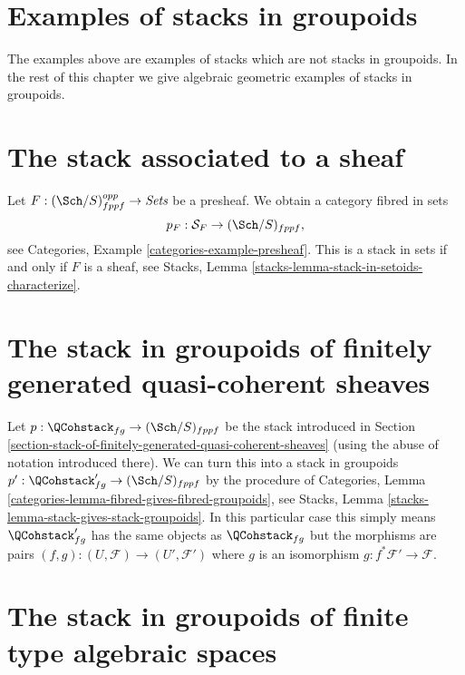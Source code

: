 \section{Examples of stacks in groupoids}
\label{section-examples-stacks-in-groupoids}

\noindent
The examples above are examples of stacks which are not stacks in
groupoids. In the rest of this chapter we give
algebraic geometric examples of stacks in groupoids.



\section{The stack associated to a sheaf}
\label{section-stack-associated-to-sheaf}

\noindent
Let $F : (\Sch/S)_{fppf}^{opp} \to \textit{Sets}$ be a presheaf.
We obtain a category fibred in sets
$$
p_F : \mathcal{S}_F \to (\Sch/S)_{fppf},
$$
see
Categories, Example \ref{categories-example-presheaf}.
This is a stack in sets if and only if $F$ is a sheaf, see
Stacks, Lemma \ref{stacks-lemma-stack-in-setoids-characterize}.



\section{The stack in groupoids of finitely generated quasi-coherent sheaves}
\label{section-stack-in-groupoids-of-quasi-coherent-sheaves}

\noindent
Let $p : \QCohstack_{fg} \to (\Sch/S)_{fppf}$ be the stack
introduced in
Section \ref{section-stack-of-finitely-generated-quasi-coherent-sheaves}
(using the abuse of notation introduced there).
We can turn this into a stack in groupoids
$p' : \QCohstack_{fg}' \to (\Sch/S)_{fppf}$ by
the procedure of
Categories, Lemma \ref{categories-lemma-fibred-gives-fibred-groupoids},
see
Stacks, Lemma \ref{stacks-lemma-stack-gives-stack-groupoids}.
In this particular case this simply means $\QCohstack_{fg}'$ has
the same objects as $\QCohstack_{fg}$ but the morphisms are
pairs $(f, g) : (U, \mathcal{F}) \to (U', \mathcal{F}')$
where $g$ is an isomorphism $g : f^*\mathcal{F}' \to \mathcal{F}$.


\section{The stack in groupoids of finite type algebraic spaces}
\label{section-stack-in-groupoids-of-finite-type-spaces}

